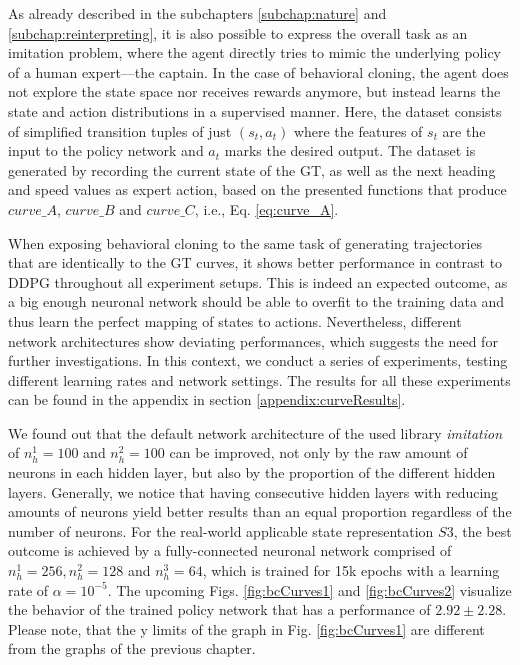 As already described in the subchapters \ref{subchap:nature} and \ref{subchap:reinterpreting}, it is also possible to express the overall task as an imitation problem, where the agent directly tries to mimic the underlying policy of a human expert—the captain. In the case of behavioral cloning, the agent does not explore the state space nor receives rewards anymore, but instead learns the state and action distributions in a supervised manner. Here, the dataset consists of simplified transition tuples of just $(s_t, a_t)$ where the features of $s_t$ are the input to the policy network and $a_t$ marks the desired output. The dataset is generated by recording the current state of the GT, as well as the next heading and speed values as expert action, based on the presented functions that produce $curve\_A$, $curve\_B$ and $curve\_C$, i.e., Eq. \ref{eq:curve_A}.
\par
When exposing behavioral cloning to the same task of generating trajectories that are identically to the GT curves, it shows better performance in contrast to DDPG throughout all experiment setups. This is indeed an expected outcome, as a big enough neuronal network should be able to overfit to the training data and thus learn the perfect mapping of states to actions. Nevertheless, different network architectures show deviating performances, which suggests the need for further investigations. In this context, we conduct a series of experiments, testing different learning rates and network settings. The results for all these experiments can be found in the appendix in section \ref{appendix:curveResults}.
\par
We found out that the default network architecture of the used library \textit{imitation} of $n_{h}^{1}=100$ and $n_{h}^{2}=100$ can be improved, not only by the raw amount of neurons in each hidden layer, but also by the proportion of the different hidden layers. Generally, we notice that having consecutive hidden layers with reducing amounts of neurons yield better results than an equal proportion regardless of the number of neurons. For the real-world applicable state representation $S3$, the best outcome is achieved by a fully-connected neuronal network comprised of $n_{h}^{1}=256, n_{h}^{2}=128$ and $n_{h}^{3}=64$, which is trained for 15k epochs with a learning rate of $\alpha = 10^{-5}$. The upcoming Figs. \ref{fig:bcCurves1} and \ref{fig:bcCurves2} visualize the behavior of the trained policy network that has a performance of $2.92 \pm 2.28$. Please note, that the y limits of the graph in Fig. \ref{fig:bcCurves1} are different from the graphs of the previous chapter.

